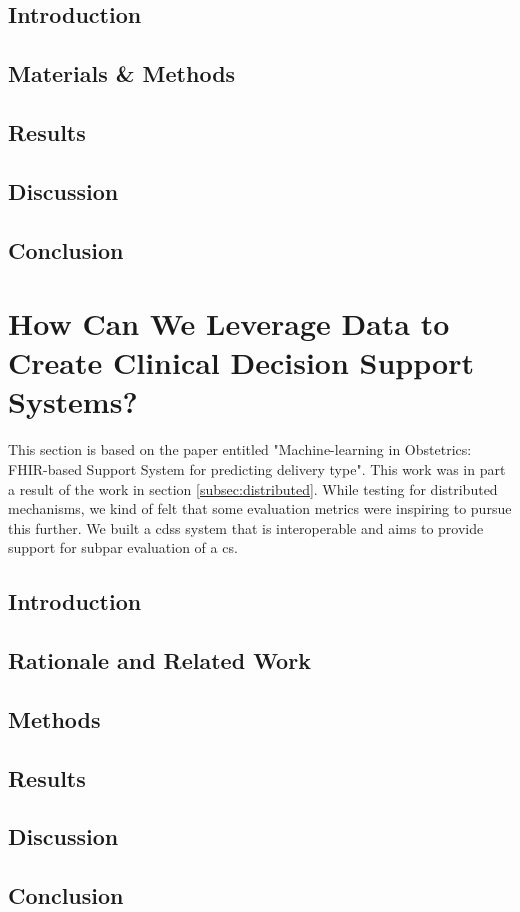     
\subsection{Introduction}
    
    \subsection{Materials \& Methods}
    
    \subsection{Results}
    
    \subsection{Discussion}
    
    \subsection{Conclusion}
    
    
    
    \section{How Can We Leverage Data to Create Clinical Decision Support Systems?}\label{subsec:obs}
    This section is based on the paper entitled "Machine-learning in Obstetrics: FHIR-based Support System for predicting delivery type". This work was in part a result of the work in section \ref{subsec:distributed}. While testing for distributed mechanisms, we kind of felt that some evaluation metrics were inspiring to pursue this further. We built a \ac{cdss} system that is interoperable and aims to provide support for subpar evaluation of a \ac{cs}.
    
    \subsection{Introduction}
    
    \subsection{Rationale and Related Work}
    
    \subsection{Methods}
    
    \subsection{Results}
    
    \subsection{Discussion}
    
    \subsection{Conclusion}
    
    
    
    
    